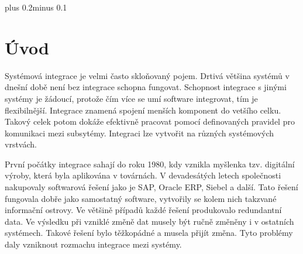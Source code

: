 \documentclass[11pt,twoside,a4paper]{book}
\begin{document}
\lstlistoflistings 



\mainbodystarts
\normalfont
{}\baselineskip plus 0.2\baselineskip minus 0.1\baselineskip



% 
% 

% 
\chapter{Úvod} 
Systémová integrace je velmi často skloňovaný pojem. Drtivá většina systémů v dnešní době
není bez integrace schopna fungovat. Schopnost integrace s jinými systémy je žádoucí,
protože čím více se umí software integrovat, tím je flexibilnější. Integrace znamená spojení
menších komponent do vetšího celku. Takový celek potom dokáže efektivně pracovat pomocí
definovaných pravidel pro komunikaci mezi subsytémy. Integraci lze vytvořit na různých
systémových vrstvách.

První počátky integrace sahají do roku 1980, kdy vznikla myšlenka tzv. digitální výroby, která
byla aplikována v továrnách. V devadesátých letech společnosti nakupovaly softwarová řešení
jako je SAP, Oracle ERP, Siebel a další. Tato řešení fungovala dobře jako samostatný
software, vytvořily se kolem nich takzvané informační ostrovy. Ve většině případů každé
řešení produkovalo redundantní data. Ve výsledku při vzniklé změně dat musely být ručně
změněny i v ostatních systémech. Takové řešení bylo těžkopádné a musela přijít změna. Tyto
problémy daly vzniknout rozmachu integrace mezi systémy.
\end{document}
